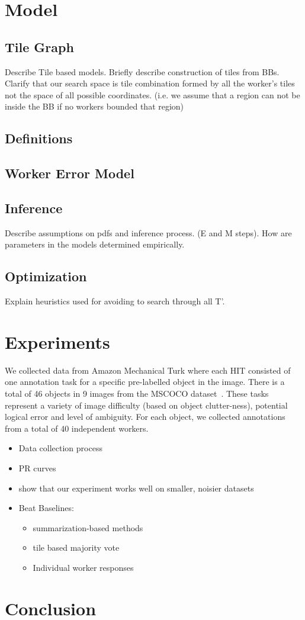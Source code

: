 \documentclass[letterpaper]{article} %
\begin{document}
\section{Model}
\subsection{Tile Graph} Describe Tile based models. Briefly describe construction of tiles from BBs.
Clarify that our search space is tile combination formed by all the worker's tiles not the space of all possible coordinates. (i.e. we assume that a region can not be inside the BB if no workers bounded that region) 
\subsection{Definitions}
\subsection{Worker Error Model}
\subsection{Inference}
Describe assumptions on pdfs and inference process. (E and M steps). How are parameters in the models determined empirically.
\subsection{Optimization}
Explain heuristics used for avoiding to search through all T'. 
\section{Experiments}
We collected data from Amazon Mechanical Turk where each HIT consisted of one annotation task for a specific pre-labelled object in the image. There is a total of 46 objects in 9 images from the MSCOCO dataset~\cite{Lin2014}. These tasks represent a variety of image difficulty (based on object clutter-ness), potential logical error and level of ambiguity.   For each object, we collected annotations from a total of 40 independent workers.
\begin{itemize}
\item Data collection process
\item PR curves
\item show that our experiment works well on smaller, noisier datasets
\item Beat Baselines: 
\begin{itemize}
\item summarization-based methods
\item tile based majority vote 
\item Individual worker responses
\end{itemize}
\end{itemize}
\section{Conclusion}


\end{document}
